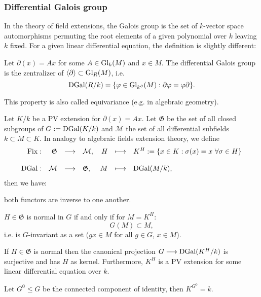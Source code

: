 \subsubsection{Differential Galois group}
In the theory of field extensions, the Galois group is the set of $k$-vector space automorphisms permuting the root elements of a given polynomial over $k$ leaving $k$ fixed. For a given linear differential equation, the definition is slightly different:
\begin{defi}
Let $\partial(x) = A x$ for some $A \in \trm{Gl}_k(M)$ and $x \in M$. The differential Galois group is the zentralizer of $\left<\partial\right> \subset \trm{Gl}_R(M)$, i.e.
$$\trm{DGal}(R/k) = \{\varphi \in \trm{Gl}_{k^\partial}(M) : \partial \varphi = \varphi \partial\}.$$
\end{defi}
This property is also called equivariance (e.g. in algebraic geometry).
\begin{satz}
Let $K/k$ be a PV extension for $\partial(x) = A x$. Let $\mathfrak{G}$ be the set of all closed subgroups of $G := \trm{DGal}(K/k)$ and $\mathcal{M}$ the set of all differential subfields $k \subset M \subset K$. In analogy to algebraic fields extension theory, we define 
$$\bao{rrclrcl}
\trm{Fix} : &\mathfrak{G} &\longrightarrow& \mathcal{M},& H &\longmapsto& K^H := \{x \in K : \sigma(x) = x\ \forall \sigma \in H\}\\
&&&&&\\
\trm{DGal} : & \mathcal{M} &\longrightarrow& \mathfrak{G},& M &\longmapsto& \trm{DGal}(M/k),\\
\ea$$
then we have:
\bn
\item both functors are inverse to one another.
\item $H \in \mathfrak{G}$ is normal in $G$ if and only if for $M = K^H$:
$$G(M) \subset M,$$
i.e. is $G$-invariant as a set ($g x \in M$ for all $g \in G$, $x \in M$).
\item If $H \in \mathfrak{G}$ is normal then the canonical projection $G \longrightarrow \trm{DGal}(K^H/k)$ is surjective and has $H$ as kernel. Furthermore, $K^H$ is a PV extension for some linear differential equation over $k$.
\item Let $G^0 \leq G$ be the connected component of identity, then $K^{G^0} = k$.
\en
\end{satz}
